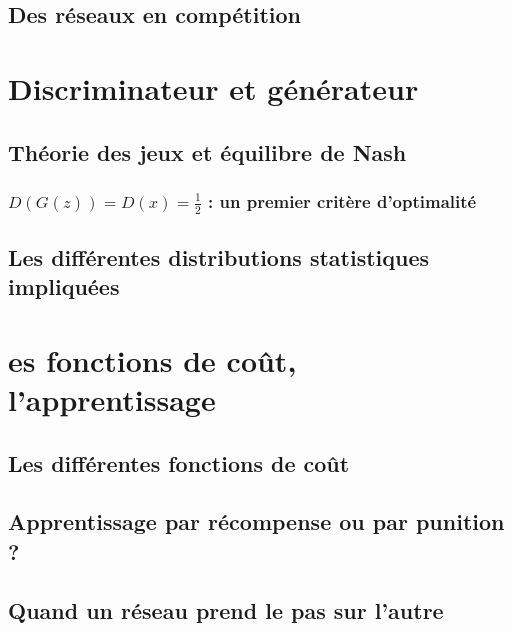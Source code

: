 \subsection{Des réseaux en compétition}

\section{Discriminateur et générateur}
\subsection{Théorie des jeux et équilibre de Nash}
\subsubsection{$D(G(z)) = D(x) = \frac{1}{2}$ : un premier critère d'optimalité}
\subsection{Les différentes distributions statistiques impliquées}
\section{es fonctions de coût, l'apprentissage}
\subsection{Les différentes fonctions de coût}
\subsection{Apprentissage par récompense ou par punition ?}
\subsection{Quand un réseau prend le pas sur l'autre}
